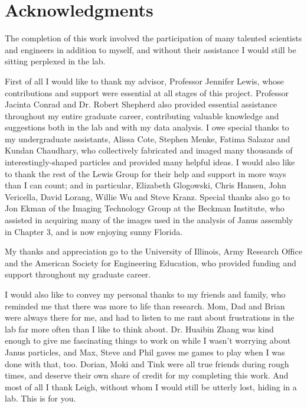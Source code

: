 \chapter*{Acknowledgments}

The completion of this work involved the participation of many 
talented scientists and engineers in addition to myself,
and without their assistance I would still be sitting perplexed in the lab.  

First of all I would like to thank my advisor, Professor Jennifer 
Lewis, whose contributions and support were essential at all 
stages of this project.  Professor Jacinta Conrad and Dr. Robert
Shepherd also provided essential assistance throughout my 
entire graduate career, contributing valuable knowledge and 
suggestions both in the lab and with my data analysis.  I owe
special thanks to my undergraduate assistants, Alissa Cote,
Stephen Menke, Fatima Salazar and Kundan Chaudhary, who collectively 
fabricated and imaged many thousands of interestingly-shaped particles
and provided many helpful ideas.  I would also like to thank 
the rest of the Lewis Group for their help and support in more ways than
I can count; and in particular, Elizabeth Glogowski, Chris Hansen, John
Vericella, David Lorang, Willie Wu and Steve Kranz.  Special thanks also go to Jon
Ekman of the Imaging Technology Group at the Beckman Institute, who
assisted in acquiring many of the images used in the analysis of Janus
assembly in Chapter 3, and is now enjoying sunny Florida.

My thanks and appreciation go to the University of 
Illinois, Army Research Office and 
the American Society for Engineering Education, who provided
funding and support throughout my graduate career.

I would also like to convey my personal thanks to my friends and 
family, who reminded me that there was more to life than research.
Mom, Dad and Brian were always there for me, and had to listen to me rant
about frustrations in the lab far more often than I like to think
about.  Dr. Huaibin Zhang was kind enough to give me fascinating things
to work on while I wasn't worrying about Janus particles, and Max,
Steve and Phil gaves me games to play when I was done with that, too.
Dorian, Moki and Tink were all true friends during rough times, and 
deserve their own share of credit for my completing this work.
And most of all I thank Leigh, without whom I would still be 
utterly lost, hiding in a lab.  This is for you.
